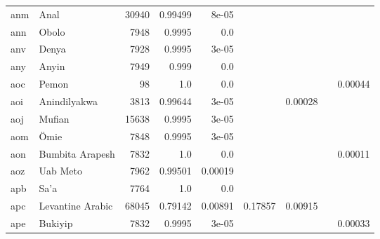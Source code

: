 \documentclass[11pt]{article}
\begin{document}
\begin{table*}[h]
{\begin{tabular}{llrrrrrrr}
anm         & Anal         & 30940         & 0.99499         & 8e-05         &          &          &          &          \\

ann         & Obolo         & 7948         & 0.9995         & 0.0         &          &          &          &          \\

anv         & Denya         & 7928         & 0.9995         & 3e-05         &          &          &          &          \\

any         & Anyin         & 7949         & 0.999         & 0.0         &          &          &          &          \\

aoc         & Pemon         & 98         & 1.0         & 0.0         &          &          &          & 0.00044         \\

aoi         & Anindilyakwa         & 3813         & 0.99644         & 3e-05         &          & 0.00028         &          &          \\

aoj         & Mufian         & 15638         & 0.9995         & 3e-05         &          &          &          &          \\

aom         & Ömie         & 7848         & 0.9995         & 3e-05         &          &          &          &          \\

aon         & Bumbita Arapesh         & 7832         & 1.0         & 0.0         &          &          &          & 0.00011         \\

aoz         & Uab Meto         & 7962         & 0.99501         & 0.00019         &          &          &          &          \\

apb         & Sa'a         & 7764         & 1.0         & 0.0         &          &          &          &          \\

apc         & Levantine Arabic         & 68045         & 0.79142         & 0.00891         & 0.17857         & 0.00915         &          &          \\

ape         & Bukiyip         & 7832         & 0.9995         & 3e-05         &          &          &          & 0.00033         \\


\end{tabular}}
\end{table*}
\end{document}
